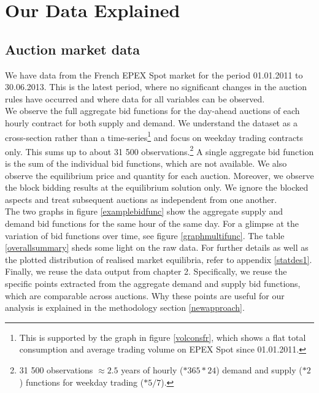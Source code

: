 \section{Our Data Explained}
\label{pschapter}

\label{datasection}
\subsection*{Auction market data}
We have data from the French EPEX Spot market for the period 01.01.2011 to 30.06.2013. This is the latest period, where no significant changes in the auction rules have occurred and where data for all variables can be observed. \\

We observe the full aggregate bid functions for the day-ahead auctions of each hourly contract for both supply and demand. We understand the dataset as a cross-section rather than a time-series\footnote{This is supported by the graph in figure \ref{volconsfr}, which shows a flat total consumption and average trading volume on EPEX Spot since 01.01.2011.} and focus on weekday trading contracts only. This sums up to about 31 500 observations.\footnote{31 500 observations $\approx 2.5$ years of hourly ($*365 *24$) demand and supply ($*2$) functions for weekday trading ($*5/7$).} A single aggregate bid function is the sum of the individual bid functions, which are not available. We also observe the equilibrium price and quantity for each auction. Moreover, we observe the block bidding results at the equilibrium solution only. We ignore the blocked aspects and treat subsequent auctions as independent from one another.\\
	
The two graphs in figure \ref{examplebidfunc} show the aggregate supply and demand bid functions for the same hour of the same day. For a glimpse at the variation of bid functions over time, see figure \ref{graphmultifunc}. The table \ref{overallsummary} sheds some light on the raw data. For further details as well as the plotted distribution of realised market equilibria, refer to appendix \ref{statdes1}. \\

Finally, we reuse the data output from chapter 2. Specifically, we reuse the specific points extracted from the aggregate demand and supply bid functions, which are comparable across auctions. Why these points are useful for our analysis is explained in the methodology section \ref{newapproach}.

